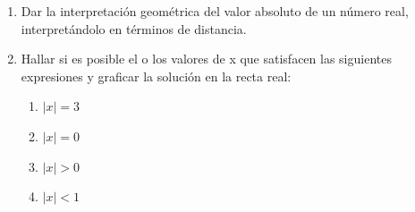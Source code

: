 \documentclass[12pt]{article}
\theoremstyle{definition}
\newtheorem*{mydef}{Definición}
\begin{document}
\begin{enumerate}
\begin{enumerate}
\begin{multicols}{2}
\end{multicols}
\end{enumerate}

\section{Valor absoluto. El valor absoluto como distancia}



\item Dar la interpretación geométrica del valor absoluto de un número real, interpretándolo en términos de distancia.

\item Hallar si es posible el o los valores de x que satisfacen las siguientes expresiones y graficar la solución en la recta real: 
\begin{multicols}{4}
\begin{enumerate}
\setlength\itemsep{0em}
\item $|x| = 3$
\item $|x| = 0$
\item $|x| > 0$
\item $|x| < 1$
\end{enumerate}
\end{multicols}


\end{enumerate}
\end{document}

